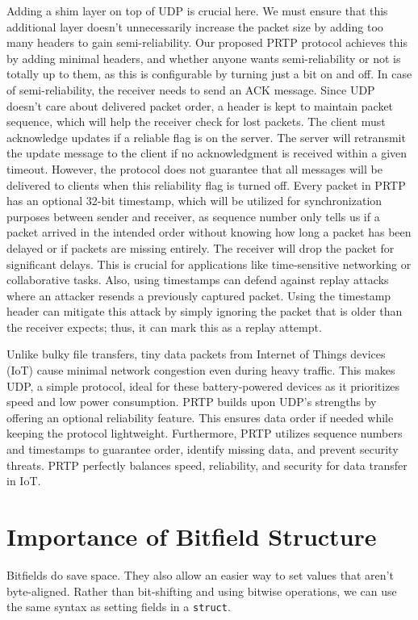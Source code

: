 \documentclass[lettersize,journal]{IEEEtran}
\begin{document}
Adding a shim layer on top of UDP is crucial here. We must ensure that this additional layer doesn't unnecessarily increase the packet size by adding too many headers to gain semi-reliability. Our proposed PRTP protocol achieves this by adding minimal headers, and whether anyone wants semi-reliability or not is totally up to them, as this is configurable by turning just a bit on and off. In case of semi-reliability, the receiver needs to send an ACK message. Since UDP doesn't care about delivered packet order, a header is kept to maintain packet sequence, which will help the receiver check for lost packets. The client must acknowledge updates if a reliable flag is on the server. The server will retransmit the update message to the client if no acknowledgment is received within a given timeout. However, the protocol does not guarantee that all messages will be delivered to clients when this reliability flag is turned off. Every packet in PRTP has an optional 32-bit timestamp, which will be utilized for synchronization purposes between sender and receiver, as sequence number only tells us if a packet arrived in the intended order without knowing how long a packet has been delayed or if packets are missing entirely. The receiver will drop the packet for significant delays. This is crucial for applications like time-sensitive networking or collaborative tasks. Also, using timestamps can defend against replay attacks where an attacker resends a previously captured packet. Using the timestamp header can mitigate this attack by simply ignoring the packet that is older than the receiver expects; thus, it can mark this as a replay attempt.

Unlike bulky file transfers, tiny data packets from Internet of Things devices (IoT) cause minimal network congestion even during heavy traffic. This makes UDP, a simple protocol, ideal for these battery-powered devices as it prioritizes speed and low power consumption. PRTP builds upon UDP's strengths by offering an optional reliability feature. This ensures data order if needed while keeping the protocol lightweight. Furthermore, PRTP utilizes sequence numbers and timestamps to guarantee order, identify missing data, and prevent security threats. PRTP perfectly balances speed, reliability, and security for data transfer in IoT.

\section{Importance of Bitfield Structure}
Bitfields do save space. They also allow an easier way to set values that aren't byte-aligned. Rather than bit-shifting and using bitwise operations, we can use the same syntax as setting fields in a \texttt{struct}.
\end{document}
